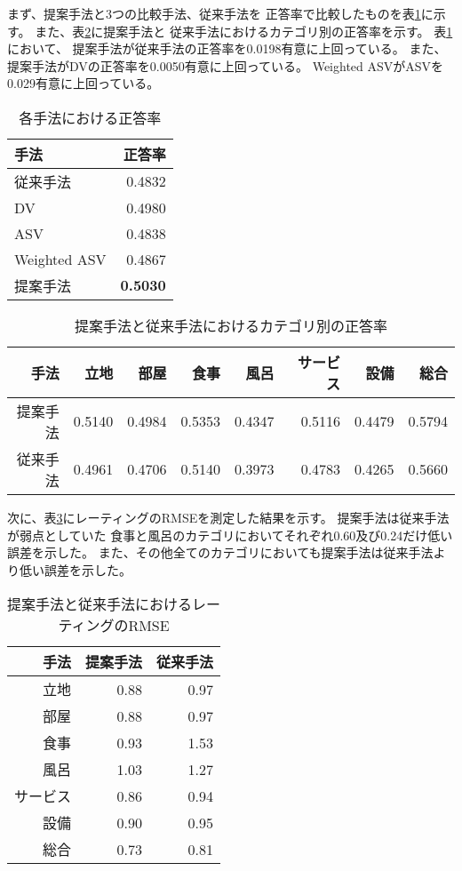 まず、提案手法と3つの比較手法、従来手法\cite{fujitani15}を
正答率で比較したものを表\ref{tab:Accuracies}に示す。
また、表\ref{tab:AccuraciesPerCategory}に提案手法と
従来手法\cite{fujitani15}におけるカテゴリ別の正答率を示す。
表\ref{tab:Accuracies}において、
提案手法が従来手法\cite{fujitani15}の正答率を0.0198有意に上回っている。
また、提案手法がDVの正答率を0.0050有意に上回っている。
Weighted ASVがASVを0.029有意に上回っている。

\begin{table}
  \caption{各手法における正答率}
  \centering
  \begin{tabular}{l | r} \label{tab:Accuracies}
    手法 & 正答率 \\
    \hline
    従来手法\cite{fujitani15} & 0.4832 \\
    DV & 0.4980 \\
    ASV & 0.4838 \\
    Weighted ASV & 0.4867 \\
    提案手法 & \textbf{0.5030} \\
  \end{tabular}
\end{table}

\begin{table}
  \caption{提案手法と従来手法\cite{fujitani15}におけるカテゴリ別の正答率}
  \centering
  \begin{tabular}{r | r r r r r r r} \label{tab:AccuraciesPerCategory}
    手法 & 立地 & 部屋 & 食事 & 風呂 & サービス & 設備 & 総合 \\
    \hline
    提案手法 & 0.5140 & 0.4984 & 0.5353 & 0.4347 & 0.5116 & 0.4479 & 0.5794 \\
    従来手法\cite{fujitani15}
        & 0.4961 & 0.4706 & 0.5140 & 0.3973 & 0.4783 & 0.4265 & 0.5660 \\
  \end{tabular}
\end{table}

次に、表\ref{tab:RMSEs}にレーティングのRMSEを測定した結果を示す。
提案手法は従来手法\cite{fujitani15}が弱点としていた
食事と風呂のカテゴリにおいてそれぞれ0.60及び0.24だけ低い誤差を示した。
また、その他全てのカテゴリにおいても提案手法は従来手法より低い誤差を示した。

\begin{table}
  \caption{提案手法と従来手法\cite{fujitani15}におけるレーティングのRMSE}
  \centering
  \begin{tabular}{r | r r} \label{tab:RMSEs}
    手法 & 提案手法 & 従来手法\cite{fujitani15} \\
    \hline
    立地      & 0.88 & 0.97 \\
    部屋      & 0.88 & 0.97 \\
    食事      & 0.93 & 1.53 \\
    風呂      & 1.03 & 1.27 \\
    サービス  & 0.86 & 0.94 \\
    設備      & 0.90 & 0.95 \\
    総合      & 0.73 & 0.81 \\
  \end{tabular}
\end{table}

